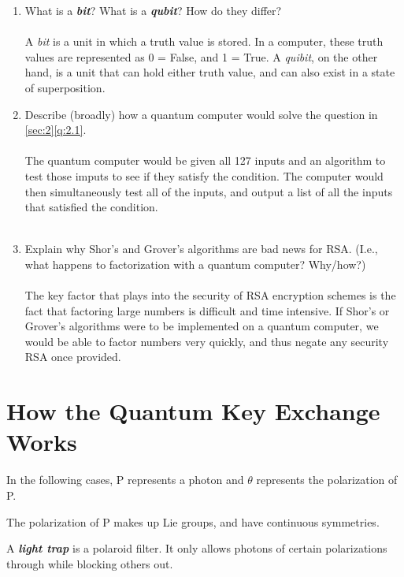 \begin{enumerate}
\begin{enumerate}
\end{enumerate}
\pagebreak
\item What is a \textit{\textbf{bit}}?  What is a \textit{\textbf{qubit}}?  How do they differ?\\
\\
A \textit{bit} is a unit in which a truth value is stored. In a computer, these truth values are represented as 0 = False, and 1 = True. A \textit{quibit}, on the other hand, is a unit that can hold either truth value, and can also exist in a state of superposition.\\
\item Describe (broadly) how a quantum computer would solve the question in \ref{sec:2}\ref{q:2.1}.\\
\\
The quantum computer would be given all 127 inputs and an algorithm to test those imputs to see if they satisfy the condition. The computer would then simultaneously test all of the inputs, and output a list of all the inputs that satisfied the condition.\\
\\
\item Explain why Shor's and Grover's algorithms are bad news for RSA. (I.e., what happens to factorization with a quantum computer?  Why/how?)\\
\\
The key factor that plays into the security of RSA encryption schemes is the fact that factoring large numbers is difficult and time intensive. If Shor's or Grover's algorithms were to be implemented on a quantum computer, we would be able to factor numbers very quickly, and thus negate any security RSA once provided.
\vfill
\end{enumerate}
\section{How the Quantum Key Exchange Works}
\item In the following cases, P represents a photon and $\theta$ represents the polarization of P.

\item The polarization of P makes up Lie groups, and have continuous symmetries.

\item A \textit{\textbf{light trap}} is a polaroid filter. It only allows photons of certain polarizations through while blocking others out.

